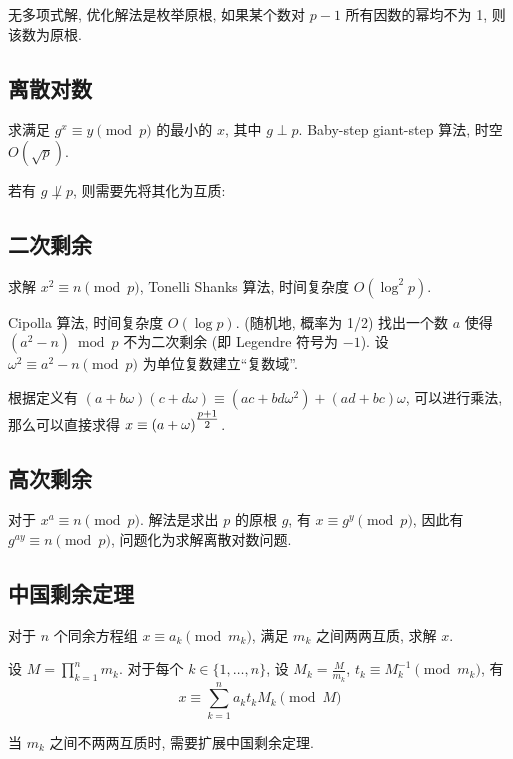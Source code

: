 无多项式解, 优化解法是枚举原根, 如果某个数对 $p-1$ 所有因数的幂均不为 1, 则该数为原根.



\subsection{离散对数}
求满足 $g^x\equiv y\pmod p$ 的最小的 $x$, 其中 $g\perp p$. Baby-step giant-step 算法, 时空 $O(\sqrt p)$.



若有 $g\not\perp p$, 则需要先将其化为互质:


\subsection{二次剩余}
求解 $x^2\equiv n\pmod p$, Tonelli Shanks 算法, 时间复杂度 $O(\log^2p)$.


Cipolla 算法, 时间复杂度 $O(\log p)$. (随机地, 概率为 1/2) 找出一个数 $a$ 使得 $(a^2-n)\bmod p$ 不为二次剩余 (即 Legendre 符号为 $-1$). 设 $\omega^2\equiv a^2-n\pmod p$ 为单位复数建立``复数域''.

根据定义有 $(a+b\omega)(c+d\omega)\equiv (ac+bd\omega^2) + (ad+bc)\omega$, 可以进行乘法, 那么可以直接求得 $x\equiv(a+\omega)^{\mathlarger{\frac{p+1}2}}$.

\subsection{高次剩余}
对于 $x^a\equiv n\pmod p$. 解法是求出 $p$ 的原根 $g$, 有 $x\equiv g^y\pmod p$, 因此有 $g^{ay}\equiv n\pmod p$, 问题化为求解离散对数问题.

\subsection{中国剩余定理}

对于 $n$ 个同余方程组 $x\equiv a_k\pmod{m_k}$, 满足 $m_k$ 之间两两互质, 求解 $x$.

设 $\displaystyle M=\prod_{k=1}^nm_k$. 对于每个 $k\in\{1,\dots, n\}$, 设 $\displaystyle M_k=\frac M{m_k}$, $t_k\equiv M_k^{-1}\pmod{m_k}$, 有 \[\displaystyle x\equiv\sum_{k=1}^na_kt_kM_k\pmod M\]



当 $m_k$ 之间不两两互质时, 需要扩展中国剩余定理.



